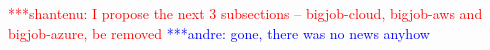 \documentclass[conference,final]{IEEEtran}
\newcommand{\jhanote}[1]{ {\textcolor{red} { ***shantenu: #1 }}}
\newcommand{\alnote}[1]{ {\textcolor{blue} { ***andre: #1 }}}
\newcommand{\alnote}[1]{}
\newcommand{\jhanote}[1]{}
\begin{document}


\jhanote{I propose the next 3 subsections -- bigjob-cloud, bigjob-aws
  and bigjob-azure, be removed}\alnote{gone, there was no news anyhow}

% 
% 
% 
\end{document}
